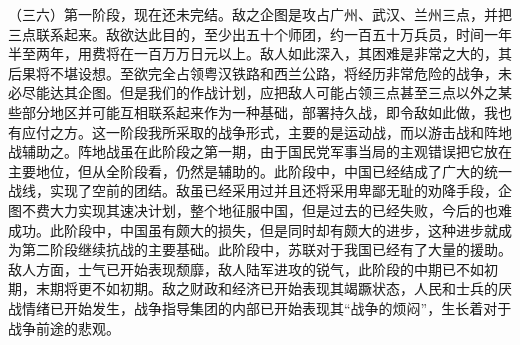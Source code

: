 （三六）第一阶段，现在还未完结。敌之企图是攻占广州、武汉、兰州三点，并把三点联系起来。敌欲达此目的，至少出五十个师团，约一百五十万兵员，时间一年半至两年，用费将在一百万万日元以上。敌人如此深入，其困难是非常之大的，其后果将不堪设想。至欲完全占领粤汉铁路和西兰公路，将经历非常危险的战争，未必尽能达其企图。但是我们的作战计划，应把敌人可能占领三点甚至三点以外之某些部分地区并可能互相联系起来作为一种基础，部署持久战，即令敌如此做，我也有应付之方。这一阶段我所采取的战争形式，主要的是运动战，而以游击战和阵地战辅助之。阵地战虽在此阶段之第一期，由于国民党军事当局的主观错误把它放在主要地位，但从全阶段看，仍然是辅助的。此阶段中，中国已经结成了广大的统一战线，实现了空前的团结。敌虽已经采用过并且还将采用卑鄙无耻的劝降手段，企图不费大力实现其速决计划，整个地征服中国，但是过去的已经失败，今后的也难成功。此阶段中，中国虽有颇大的损失，但是同时却有颇大的进步，这种进步就成为第二阶段继续抗战的主要基础。此阶段中，苏联对于我国已经有了大量的援助。敌人方面，士气已开始表现颓靡，敌人陆军进攻的锐气，此阶段的中期已不如初期，末期将更不如初期。敌之财政和经济已开始表现其竭蹶状态，人民和士兵的厌战情绪已开始发生，战争指导集团的内部已开始表现其“战争的烦闷”，生长着对于战争前途的悲观。

